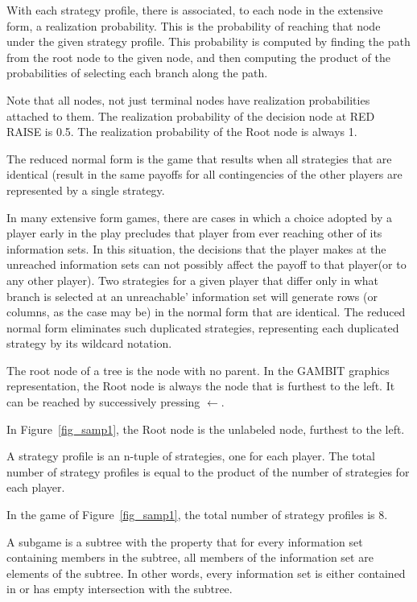 {\begin{helpglossary}
\label{realprobgloss}
With each strategy profile, there is associated, to each node in the 
extensive form, a realization probability.  This is the probability of
 reaching that node under the given strategy profile.  This probability is 
computed by finding the path from the root node to the given node, and then 
computing the product of the probabilities of selecting each branch along 
the path.  

Note that all nodes, not just terminal nodes have realization probabilities
 attached to them.  The realization probability of the decision node at RED 
RAISE is 0.5.  The realization probability of the Root node is always 1.

\label{rednormgloss}
The reduced normal form is the game that results when all strategies that 
are identical (result in  the same payoffs for all contingencies of the 
other players are represented by a single strategy.  

In many extensive form games, there are cases in which a choice adopted by 
a player early in the play precludes that player from ever reaching other 
of its information sets.  In this situation, the decisions that the player 
makes at the unreached information sets can not possibly affect the  payoff
 to that player(or to any other player).  Two strategies for a given player
 that differ only in what branch is selected at an unreachable'  information
 set will generate rows (or columns, as the case may be) in the normal form 
that are identical.  The reduced normal form eliminates such duplicated 
strategies, representing each duplicated strategy by its wildcard notation.  

\label{rootnodegloss}
The root node of a tree is the node with no parent. In the GAMBIT graphics
representation, the Root node is always the node that is furthest to the
left.  It can be reached by successively pressing {\bf $\leftarrow$}. 

In Figure~\ref{fig_samp1}, the Root node is the unlabeled node, furthest to 
the left.

\label{stratprofgloss}
A strategy profile is an n-tuple of strategies, one for each player. The 
total number of strategy profiles is equal to the product of the number of 
strategies for each player. 
 
In the game of  Figure~\ref{fig_samp1}, the total number of strategy profiles
 is 8. 

\label{subgamegloss}
A subgame is a subtree with the property that for every information 
set containing members in the subtree, all members of the information 
set are elements of the subtree.  In other words, every information set 
is either contained in or has empty intersection with the subtree. 


\end{helpglossary}}
